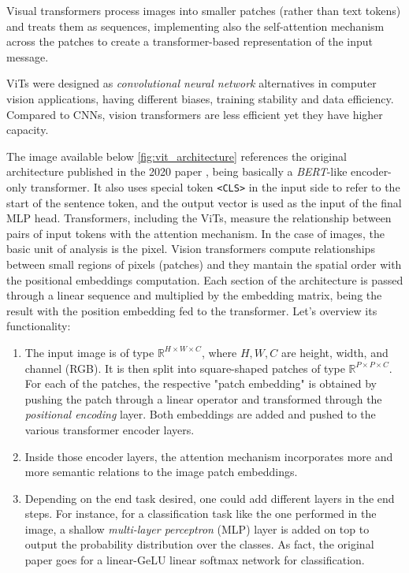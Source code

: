 Visual transformers process images into smaller patches (rather than text tokens) and treats them as sequences, implementing also the self-attention mechanism across the patches to create a transformer-based representation of the input message.

ViTs were designed as \textit{convolutional neural network} alternatives in computer vision applications, having different biases, training stability and data efficiency. Compared to CNNs, vision transformers are less efficient yet they have higher capacity. 

The image available below \ref{fig:vit_architecture} references the original architecture published in the 2020 paper \cite{dosovitskiy2021imageworth16x16words}, being basically a \textit{BERT}-like encoder-only transformer. It also uses special token \texttt{<CLS>} in the input side to refer to the start of the sentence token, and the output vector is used as the input of the final MLP head. Transformers, including the ViTs, measure the relationship between pairs of input tokens with the attention mechanism. In the case of images, the basic unit of analysis is the pixel. Vision transformers compute relationships between small regions of pixels (patches) and they mantain the spatial order with the positional embeddings computation. Each section of the architecture is passed through a linear sequence and multiplied by the embedding matrix, being the result with the position embedding fed to the transformer. Let's overview its functionality:

\begin{enumerate}
	\item The input image is of type $\mathbb{R}^{H \times W \times C}$, where $H, W, C$ are height, width, and channel (RGB). It is then split into square-shaped patches of type $\mathbb{R}^{P \times P \times C}$. For each of the patches, the respective "patch embedding" is obtained by pushing the patch through a linear operator and transformed through the \textit{positional encoding} layer. Both embeddings are added and pushed to the various transformer encoder layers. 
	
	\item Inside those encoder layers, the attention mechanism incorporates more and more semantic relations to the image patch embeddings. 
	
	\item Depending on the end task desired, one could add different layers in the end steps. For instance, for a classification task like the one performed in the image, a shallow \textit{multi-layer perceptron} (MLP) layer is added on top to output the probability distribution over the classes. As fact, the original paper goes for a linear-GeLU linear softmax network for classification. 
	
\end{enumerate}

